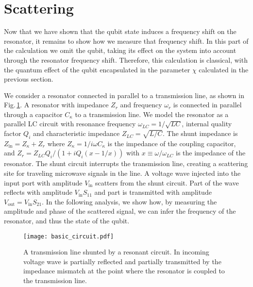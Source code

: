 \section{Scattering}

Now that we have shown that the qubit state induces a frequency shift on the resonator, it remains to show how we measure that frequency shift.
In this part of the calculation we omit the qubit, taking its effect on the system into account through the resonator frequency shift.
Therefore, this calculation is classical, with the quantum effect of the qubit encapsulated in the parameter $\chi$ calculated in the previous section.

We consider a resonator connected in parallel to a transmission line, as shown in Fig.\,\ref{Fig:scatteringDiagram}.
A resonator with impedance $Z_r$ and frequency $\omega_r$ is connected in parallel through a capacitor $C_{\kappa}$ to a transmission line.
We model the resonator as a parallel LC circuit with resonance frequency $\omega_{LC}=1/\sqrt{LC}$, internal quality factor $Q_i$ and characteristic impedance $Z_{LC}=\sqrt{L/C}$.
The shunt impedance is $Z_{\text{in}}=Z_{\kappa} + Z_r$ where $Z_{\kappa} = 1/i\omega C_{\kappa}$ is the impedance of the coupling capacitor, and $Z_r = Z_{LC}Q_i/(1+iQ_i(x-1/x))$ with $x \equiv \omega/\omega_{LC}$ is the impedance of the resonator.
The shunt circuit interrupts the transmission line, creating a scattering site for traveling microwave signals in the line.
A voltage wave injected into the input port with amplitude $V_{\textrm{in}}$ scatters from the shunt circuit.
Part of the wave reflects with amplitude $V_{\textrm{in}}S_{11}$ and part is transmitted with amplitude $V_{\textrm{out}}=V_{\textrm{in}}S_{21}$.
In the following analysis, we show how, by measuring the amplitude and phase of the scattered signal, we can infer the frequency of the resonator, and thus the state of the qubit.

\begin{figure}
\begin{centering}
\texttt{[image: basic\_circuit.pdf]} 
\par\end{centering}
\caption{A transmission line shunted by a resonant circuit. In incoming voltage wave is partially reflected and partially transmitted by the impedance mismatch at the point where the resonator is coupled to the transmission line.}
\label{Fig:scatteringDiagram}
\end{figure}

